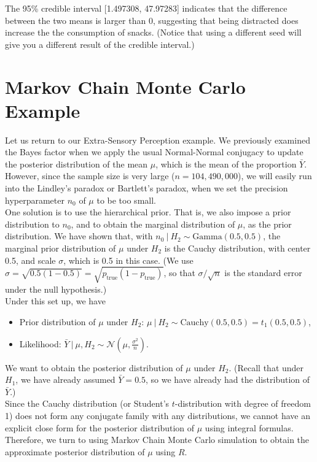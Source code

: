 \documentclass{article}
\def\dsst{\displaystyle}
\begin{document}
The 95\% credible interval [1.497308, 47.97283] indicates that the difference between the two means is larger than 0, suggesting that being distracted does increase the the consumption of snacks. (Notice that using a different seed will give you a different result of the credible interval.)
 
\section{Markov Chain Monte Carlo Example}

Let us return to our Extra-Sensory Perception example. We previously examined the Bayes factor when we apply the usual Normal-Normal conjugacy to update the posterior distribution of the mean $\mu$, which is the mean of the proportion $\bar{Y}$. However, since the sample size is very large ($n = 104,490,000$), we will easily run into the Lindley's paradox or Bartlett's paradox, when we set the precision hyperparameter $n_0$ of $\mu$ to be too small.\\

One solution is to use the hierarchical prior. That is, we also impose a prior distribution to $n_0$, and to obtain the marginal distribution of $\mu$, as the prior distribution. We have shown that, with $n_0~|~H_2 \sim \text{Gamma}(0.5, 0.5)$, the marginal prior distribution of $\mu$ under $H_2$ is the Cauchy distribution, with center 0.5, and scale $\sigma$, which is 0.5 in this case. (We use $\sigma = \sqrt{0.5(1-0.5)} = \sqrt{p_\text{true}(1 - p_\text{true})}$, so that $\sigma/\sqrt{n}$ is the standard error under the null hypothesis.)\\

Under this set up, we have
\begin{itemize}
	\item Prior distribution of $\mu$ under $H_2$: $\mu~|~H_2 \sim \text{Cauchy}(0.5, 0.5) = t_1(0.5, 0.5)$,
	
	\item Likelihood: $\bar{Y}~|~\mu, H_2 \sim \mathcal{N}(\mu, \dsst \frac{\sigma^2}{n})$.
\end{itemize}
We want to obtain the posterior distribution of $\mu$ under $H_2$. (Recall that under $H_1$, we have already assumed $\bar{Y} = 0.5$, so we have already had the distribution of $\bar{Y}$.)\\

Since the Cauchy distribution (or Student's $t$-distribution with degree of freedom 1) does not form any conjugate family with any distributions, we cannot have an explicit close form for the posterior distribution of $\mu$ using integral formulas. Therefore, we turn to using Markov Chain Monte Carlo simulation to obtain the approximate posterior distribution of $\mu$ using $R$.\\
\end{document}

